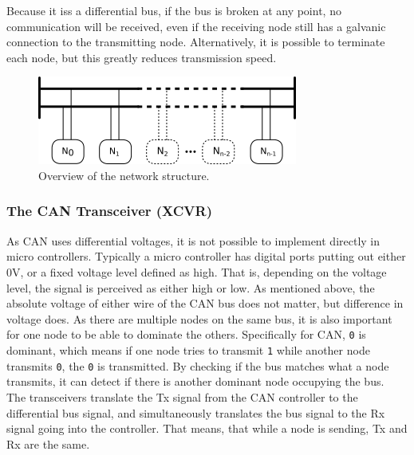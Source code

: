 Because it iss a differential bus, if the bus is broken at any point, no communication will be received, even if the receiving node still has a galvanic connection to the transmitting node.
Alternatively, it is possible to terminate each node, but this greatly reduces transmission speed.

\begin{figure}[h]
	\centering
	\includegraphics[width=.75\linewidth]{graphics/analysis_nodes}
	\caption{Overview of the network structure.}
	\label{fig:analysisnodes}
\end{figure}

\subsubsection*{The CAN Transceiver (XCVR)}
As CAN uses differential voltages, it is not possible to implement directly in micro controllers.
Typically a micro controller has digital ports putting out either $ 0 \si{\volt}$, or a fixed voltage level defined as high.
That is, depending on the voltage level, the signal is perceived as either high or low.
As mentioned above, the absolute voltage of either wire of the CAN bus does not matter, but difference in voltage does. 
As there are multiple nodes on the same bus, it is also important for one node to be able to dominate the others.
Specifically for CAN, \texttt{0} is dominant, which means if one node tries to transmit \texttt{1} while another node transmits \texttt{0}, the \texttt{0} is transmitted.
By checking if the bus matches what a node transmits, it can detect if there is another dominant node occupying the bus.\\

The transceivers translate the Tx signal from the CAN controller to the differential bus signal, and simultaneously translates the bus signal to the Rx signal going into the controller.
That means, that while a node is sending, Tx and Rx are the same.

